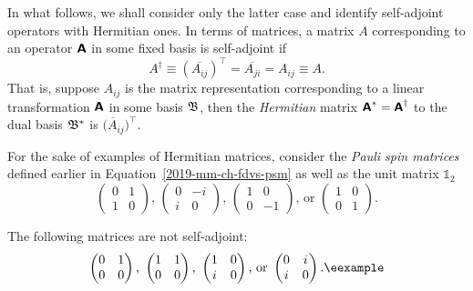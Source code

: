 In what follows, we shall consider only the latter case and identify self-adjoint operators with Hermitian ones.
In terms of matrices, a matrix $A$ corresponding to an operator $\textsf{\textbf{A}}$ in
some fixed basis is self-adjoint
if
\begin{equation}
A^{\dagger}\equiv (\overline{A_{ij}})^\intercal =  \overline{A_{ji}} =A_{ij} \equiv A.
\end{equation}
That is, suppose $A_{ij}$ is the matrix representation
corresponding to a linear transformation $\textsf{\textbf{A}}$  in some basis ${\frak B}$,
then the {\em Hermitian} matrix $\textsf{\textbf{A}}^\ast = \textsf{\textbf{A}}^\dagger$
to the dual basis
${\frak B}^\ast $
is
$\overline{(A_{ij}})^\intercal $.



{\color{blue}
\bexample
For the sake of examples of Hermitian matrices, consider the
{\em Pauli spin matrices} defined earlier in Equation~\ref{2019-mm-ch-fdvs-psm} as well as the unit matrix $\mathbb{1}_2$
\begin{equation}
\begin{pmatrix}
0&1\\
1&0
\end{pmatrix}
\text{, }
\begin{pmatrix}
0&-i\\
i&0
\end{pmatrix}
\text{, }
\begin{pmatrix}
1&0\\
0&-1
\end{pmatrix}
\text{, or }
\begin{pmatrix}
1&0\\
0&1
\end{pmatrix}
.
\end{equation}


The following matrices are not self-adjoint:
\begin{equation}
\begin{pmatrix}
0&1\\
0&0
\end{pmatrix}
\text{, }
\begin{pmatrix}
1&1\\
0&0
\end{pmatrix}
\text{, }
\begin{pmatrix}
1&0\\
i&0
\end{pmatrix}
\text{, or }
\begin{pmatrix}
0&i\\
i&0
\end{pmatrix}
.{\textrm{\eexample}}
\end{equation}
%
}

